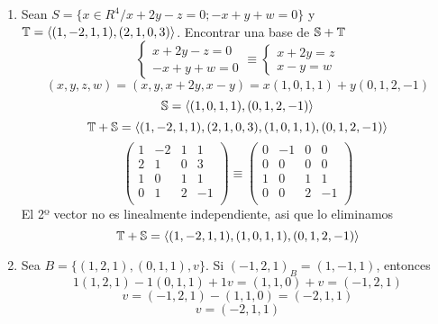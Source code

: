 \documentclass[../practica.root.tex]{subfiles}
\begin{document}
\begin{enumerate}
    \item Sean $S = \{x \in R^4 / x + 2y - z = 0; -x + y + w = 0\}$ y $\T = \langle(1,-2,1,1),(2,1,0,3)\rangle$. Encontrar una base de $\S + \T$ %
          \[
              \begin{cases}
                  x + 2y - z = 0 \\
                  -x + y + w = 0
              \end{cases}
              \equiv
              \begin{cases}
                  x + 2y = z \\
                  x - y  = w
              \end{cases}
          \] \[
              (x,y,z,w) = (x,y,x + 2y,x - y) = x(1,0,1,1) + y(0,1,2,-1)
          \] \[
              \S = \langle(1,0,1,1),(0,1,2,-1)\rangle
          \] \[
              \T+\S = \langle(1,-2,1,1),(2,1,0,3),(1,0,1,1),(0,1,2,-1)\rangle
          \] \[
              \begin{pmatrix}
                  1 & -2 & 1 & 1  \\
                  2 & 1  & 0 & 3  \\
                  1 & 0  & 1 & 1  \\
                  0 & 1  & 2 & -1 \\
              \end{pmatrix}
              \equiv
              \begin{pmatrix}
                  0 & -1 & 0 & 0  \\
                  0 & 0  & 0 & 0  \\
                  1 & 0  & 1 & 1  \\
                  0 & 0  & 2 & -1 \\
              \end{pmatrix}
          \]
          El 2º vector no es linealmente independiente, asi que lo eliminamos
          \[
              \T+\S = \langle(1,-2,1,1),(1,0,1,1),(0,1,2,-1)\rangle
          \]

    \item Sea $B = \{(1,2,1),(0,1,1),v\}$. Si $(-1,2,1)_B = (1,-1,1)$, entonces
          \[
              1(1,2,1) - 1(0,1,1) + 1v = (1,1,0) + v = (-1,2,1)
          \] \[
              v = (-1,2,1) - (1,1,0) = (-2,1,1)
          \] \[
              \boxed{v = (-2,1,1)}
          \]


\end{enumerate}
\end{document}
